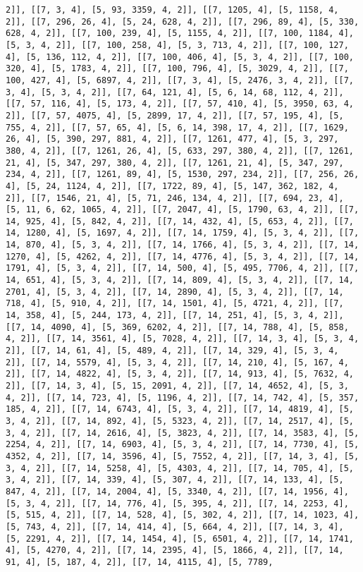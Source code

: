 \documentclass[12pt,fleqn]{article}\usepackage{../../common}
\begin{document}
\begin{verbatim}
2]], [[7, 3, 4], [5, 93, 3359, 4, 2]], [[7, 1205, 4], [5, 1158, 4, 2]], [[7, 296, 26, 4], [5, 24, 628, 4, 2]], [[7, 296, 89, 4], [5, 330, 628, 4, 2]], [[7, 100, 239, 4], [5, 1155, 4, 2]], [[7, 100, 1184, 4], [5, 3, 4, 2]], [[7, 100, 258, 4], [5, 3, 713, 4, 2]], [[7, 100, 127, 4], [5, 136, 112, 4, 2]], [[7, 100, 406, 4], [5, 3, 4, 2]], [[7, 100, 320, 4], [5, 1783, 4, 2]], [[7, 100, 796, 4], [5, 3029, 4, 2]], [[7, 100, 427, 4], [5, 6897, 4, 2]], [[7, 3, 4], [5, 2476, 3, 4, 2]], [[7, 3, 4], [5, 3, 4, 2]], [[7, 64, 121, 4], [5, 6, 14, 68, 112, 4, 2]], [[7, 57, 116, 4], [5, 173, 4, 2]], [[7, 57, 410, 4], [5, 3950, 63, 4, 2]], [[7, 57, 4075, 4], [5, 2899, 17, 4, 2]], [[7, 57, 195, 4], [5, 755, 4, 2]], [[7, 57, 65, 4], [5, 6, 14, 398, 17, 4, 2]], [[7, 1629, 26, 4], [5, 390, 297, 881, 4, 2]], [[7, 1261, 477, 4], [5, 3, 297, 380, 4, 2]], [[7, 1261, 26, 4], [5, 633, 297, 380, 4, 2]], [[7, 1261, 21, 4], [5, 347, 297, 380, 4, 2]], [[7, 1261, 21, 4], [5, 347, 297, 234, 4, 2]], [[7, 1261, 89, 4], [5, 1530, 297, 234, 2]], [[7, 256, 26, 4], [5, 24, 1124, 4, 2]], [[7, 1722, 89, 4], [5, 147, 362, 182, 4, 2]], [[7, 1546, 21, 4], [5, 71, 246, 134, 4, 2]], [[7, 694, 23, 4], [5, 11, 6, 62, 1065, 4, 2]], [[7, 2047, 4], [5, 1790, 63, 4, 2]], [[7, 14, 925, 4], [5, 842, 4, 2]], [[7, 14, 432, 4], [5, 653, 4, 2]], [[7, 14, 1280, 4], [5, 1697, 4, 2]], [[7, 14, 1759, 4], [5, 3, 4, 2]], [[7, 14, 870, 4], [5, 3, 4, 2]], [[7, 14, 1766, 4], [5, 3, 4, 2]], [[7, 14, 1270, 4], [5, 4262, 4, 2]], [[7, 14, 4776, 4], [5, 3, 4, 2]], [[7, 14, 1791, 4], [5, 3, 4, 2]], [[7, 14, 500, 4], [5, 495, 7706, 4, 2]], [[7, 14, 651, 4], [5, 3, 4, 2]], [[7, 14, 809, 4], [5, 3, 4, 2]], [[7, 14, 2701, 4], [5, 3, 4, 2]], [[7, 14, 2890, 4], [5, 3, 4, 2]], [[7, 14, 718, 4], [5, 910, 4, 2]], [[7, 14, 1501, 4], [5, 4721, 4, 2]], [[7, 14, 358, 4], [5, 244, 173, 4, 2]], [[7, 14, 251, 4], [5, 3, 4, 2]], [[7, 14, 4090, 4], [5, 369, 6202, 4, 2]], [[7, 14, 788, 4], [5, 858, 4, 2]], [[7, 14, 3561, 4], [5, 7028, 4, 2]], [[7, 14, 3, 4], [5, 3, 4, 2]], [[7, 14, 61, 4], [5, 489, 4, 2]], [[7, 14, 329, 4], [5, 3, 4, 2]], [[7, 14, 5579, 4], [5, 3, 4, 2]], [[7, 14, 210, 4], [5, 167, 4, 2]], [[7, 14, 4822, 4], [5, 3, 4, 2]], [[7, 14, 913, 4], [5, 7632, 4, 2]], [[7, 14, 3, 4], [5, 15, 2091, 4, 2]], [[7, 14, 4652, 4], [5, 3, 4, 2]], [[7, 14, 723, 4], [5, 1196, 4, 2]], [[7, 14, 742, 4], [5, 357, 185, 4, 2]], [[7, 14, 6743, 4], [5, 3, 4, 2]], [[7, 14, 4819, 4], [5, 3, 4, 2]], [[7, 14, 892, 4], [5, 5323, 4, 2]], [[7, 14, 2517, 4], [5, 3, 4, 2]], [[7, 14, 2616, 4], [5, 3823, 4, 2]], [[7, 14, 3583, 4], [5, 2254, 4, 2]], [[7, 14, 6903, 4], [5, 3, 4, 2]], [[7, 14, 7730, 4], [5, 4352, 4, 2]], [[7, 14, 3596, 4], [5, 7552, 4, 2]], [[7, 14, 3, 4], [5, 3, 4, 2]], [[7, 14, 5258, 4], [5, 4303, 4, 2]], [[7, 14, 705, 4], [5, 3, 4, 2]], [[7, 14, 339, 4], [5, 307, 4, 2]], [[7, 14, 133, 4], [5, 847, 4, 2]], [[7, 14, 2004, 4], [5, 3340, 4, 2]], [[7, 14, 1956, 4], [5, 3, 4, 2]], [[7, 14, 776, 4], [5, 395, 4, 2]], [[7, 14, 2253, 4], [5, 515, 4, 2]], [[7, 14, 528, 4], [5, 302, 4, 2]], [[7, 14, 1023, 4], [5, 743, 4, 2]], [[7, 14, 414, 4], [5, 664, 4, 2]], [[7, 14, 3, 4], [5, 2291, 4, 2]], [[7, 14, 1454, 4], [5, 6501, 4, 2]], [[7, 14, 1741, 4], [5, 4270, 4, 2]], [[7, 14, 2395, 4], [5, 1866, 4, 2]], [[7, 14, 91, 4], [5, 187, 4, 2]], [[7, 14, 4115, 4], [5, 7789, 
\end{verbatim}
\end{document}
